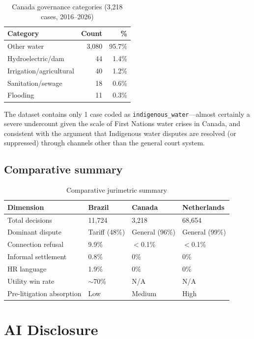 \documentclass[12pt]{article}
\begin{document}
\begin{table}[h]
\centering
\caption{Canada governance categories (3,218 cases, 2016--2026)}
\label{tab:canada}
\begin{tabular}{@{}lrr@{}}
\toprule
Category & Count & \% \\
\midrule
Other water & 3,080 & 95.7\% \\
Hydroelectric/dam & 44 & 1.4\% \\
Irrigation/agricultural & 40 & 1.2\% \\
Sanitation/sewage & 18 & 0.6\% \\
Flooding & 11 & 0.3\% \\
\bottomrule
\end{tabular}
\end{table}

The dataset contains only 1 case coded as \texttt{indigenous\_water}—almost certainly a severe undercount given the scale of First Nations water crises in Canada, and consistent with the argument that Indigenous water disputes are resolved (or suppressed) through channels other than the general court system.

\subsection{Comparative summary}

\begin{table}[h]
\centering
\caption{Comparative jurimetric summary}
\label{tab:comparative}
\begin{tabular}{@{}llll@{}}
\toprule
Dimension & Brazil & Canada & Netherlands \\
\midrule
Total decisions & 11,724 & 3,218 & 68,654 \\
Dominant dispute & Tariff (48\%) & General (96\%) & General (99\%) \\
Connection refusal & 9.9\% & $<$0.1\% & $<$0.1\% \\
Informal settlement & 0.8\% & 0\% & 0\% \\
HR language & 1.9\% & 0\% & 0\% \\
Utility win rate & $\sim$70\% & N/A & N/A \\
Pre-litigation absorption & Low & Medium & High \\
\bottomrule
\end{tabular}
\end{table}

\section{AI Disclosure}
\end{document}
